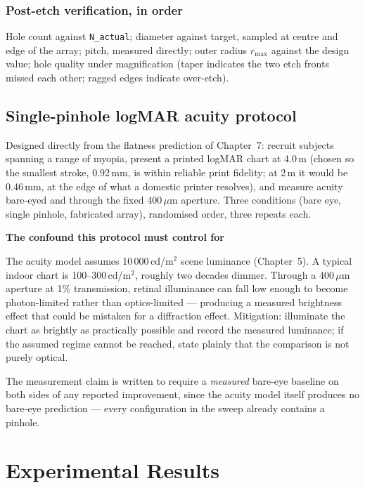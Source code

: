 \documentclass[11pt]{report}
\newenvironment{warnbox}[1]%
{\par\vspace{6pt}\begin{lrbox}{\wbsave}\begin{minipage}{0.88\textwidth}%
{\bfseries\color{warnred}#1}\par\vspace{4pt}\ignorespaces}%
{\end{minipage}\end{lrbox}%
\begin{center}\setlength{\fboxrule}{1.2pt}\setlength{\fboxsep}{7pt}%
\fcolorbox{warnred}{white}{\usebox{\wbsave}}\end{center}\vspace{6pt}\par}
\begin{document}
\subsection{Post-etch verification, in order}

Hole count against \texttt{N\_actual}; diameter against target, sampled at centre and edge
of the array; pitch, measured directly; outer radius $r_{\max}$ against the design value;
hole quality under magnification (taper indicates the two etch fronts missed each other;
ragged edges indicate over-etch).

\section{Single-pinhole logMAR acuity protocol}

Designed directly from the flatness prediction of Chapter~7: recruit subjects spanning a
range of myopia, present a printed logMAR chart at 4.0\,m (chosen so the smallest stroke,
0.92\,mm, is within reliable print fidelity; at 2\,m it would be 0.46\,mm, at the edge of
what a domestic printer resolves), and measure acuity bare-eyed and through the fixed
400\,$\mu$m aperture. Three conditions (bare eye, single pinhole, fabricated array),
randomised order, three repeats each.

\begin{warnbox}{The confound this protocol must control for}
The acuity model assumes 10\,000\,cd/m$^2$ scene luminance (Chapter~5). A typical indoor
chart is 100--300\,cd/m$^2$, roughly two decades dimmer. Through a 400\,$\mu$m aperture at
1\% transmission, retinal illuminance can fall low enough to become photon-limited rather
than optics-limited --- producing a measured brightness effect that could be mistaken for a
diffraction effect. Mitigation: illuminate the chart as brightly as practically possible and
record the measured luminance; if the assumed regime cannot be reached, state plainly that
the comparison is not purely optical.
\end{warnbox}

The measurement claim is written to require a \emph{measured} bare-eye baseline on both
sides of any reported improvement, since the acuity model itself produces no bare-eye
prediction --- every configuration in the sweep already contains a pinhole.

\chapter{Experimental Results}
\end{document}
